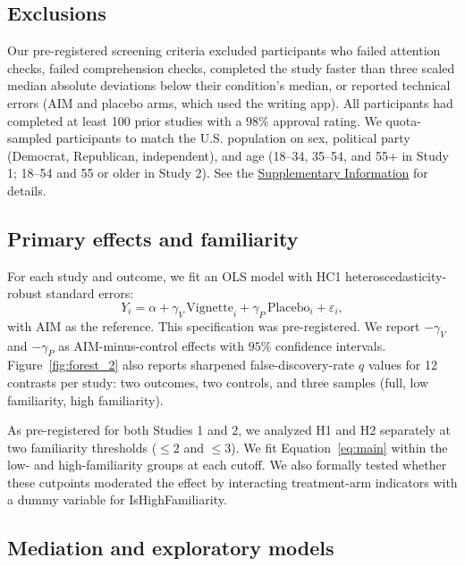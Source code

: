 \documentclass[11pt]{article}
\begin{document}
\subsection{Exclusions}
\label{sec:methods-exclusions-and-implementation-deviations}

Our pre-registered screening criteria excluded participants who failed attention checks, failed comprehension checks, completed the study faster than three scaled median absolute deviations below their condition's median, or reported technical errors (AIM and placebo arms, which used the writing app). All participants had completed at least 100 prior studies with a $98\%$ approval rating. We quota-sampled participants to match the U.S. population on sex, political party (Democrat, Republican, independent), and age (18--34, 35--54, and 55+ in Study 1; 18--54 and 55 or older in Study 2). See the \hyperref[sec:si-screening]{Supplementary Information} for details.

\subsection{Primary effects and familiarity}
\label{sec:methods-primary-effects-and-familiarity}

For each study and outcome, we fit an OLS model with HC1 heteroscedasticity-robust standard errors:
\begin{equation}
Y_i=\alpha+\gamma_V\,\mathrm{Vignette}_i+\gamma_P\,\mathrm{Placebo}_i+\varepsilon_i,
\label{eq:main}
\end{equation}
with AIM as the reference. This specification was pre-registered. We report $-\gamma_V$ and $-\gamma_P$ as AIM-minus-control effects with $95\%$ confidence intervals. Figure~\ref{fig:forest_2} also reports sharpened false-discovery-rate $q$ values for 12 contrasts per study: two outcomes, two controls, and three samples (full, low familiarity, high familiarity).

As pre-registered for both Studies 1 and 2, we analyzed H1 and H2 separately at two familiarity thresholds ($\leq 2$ and $\leq 3$). We fit Equation~\ref{eq:main} within the low- and high-familiarity groups at each cutoff. We also formally tested whether these cutpoints moderated the effect by interacting treatment-arm indicators with a dummy variable for IsHighFamiliarity.

\subsection{Mediation and exploratory models}
\label{sec:methods-mediation-and-exploratory-models}
\end{document}
